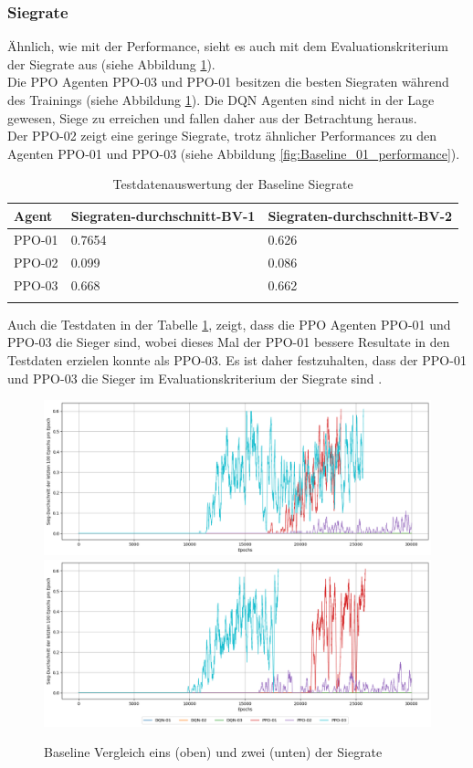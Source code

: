 \subsubsection{Siegrate}
Ähnlich, wie mit der Performance, sieht es auch mit dem Evaluationskriterium der Siegrate aus (siehe Abbildung \ref{fig:Baseline_winrate}).\\
Die PPO Agenten PPO-03 und PPO-01 besitzen die besten Siegraten während des Trainings (siehe Abbildung \ref{fig:Baseline_winrate}). 
Die DQN Agenten sind nicht in der Lage gewesen, Siege zu erreichen und fallen daher aus der Betrachtung heraus.\\
Der PPO-02 zeigt eine geringe Siegrate, trotz ähnlicher Performances zu den Agenten PPO-01 und PPO-03 (siehe Abbildung \ref{fig:Baseline_01_performance}).
\begin{longtable}[h]{|p{3.7cm}|p{4cm}|p{4cm}|}
	\hline
	Agent & Siegraten-durchschnitt-BV-1 & Siegraten-durchschnitt-BV-2 \\
	\hline
	PPO-01 & 0.7654 & 0.626 \\
	\hline
	PPO-02 & 0.099 & 0.086  \\
	\hline
	PPO-03 & 0.668 & 0.662  \\
	\hline
	\caption{Testdatenauswertung der Baseline Siegrate}
	\label{tab:Evaluation_Testdaten_Winrate} 
\end{longtable}
Auch die Testdaten in der Tabelle \ref{tab:Evaluation_Testdaten_Winrate}, zeigt, dass die PPO Agenten PPO-01 und PPO-03 die Sieger sind, wobei dieses Mal der PPO-01 bessere Resultate in den Testdaten erzielen konnte als PPO-03. Es ist daher festzuhalten, dass der PPO-01 und PPO-03 die Sieger im Evaluationskriterium der Siegrate sind .
\begin{figure}[H]
	\centering
	\includegraphics[scale=0.4517]{Abbildungen/Evaluation/win-rate_baseline_01.png}
	\includegraphics[scale=0.4515]{Abbildungen/Evaluation/win-rate_baseline_02.png}
	\caption[Baseline Vergleich Siegrate]{Baseline Vergleich eins (oben) und zwei (unten) der Siegrate}
	\label{fig:Baseline_winrate}
\end{figure}

